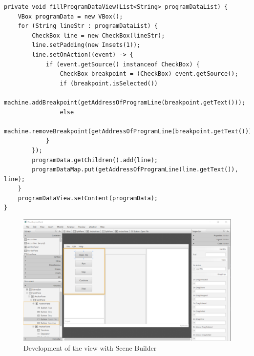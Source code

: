 \begin{lstlisting}[caption={Implementation of program data view},label=listing:ProgramDataView]
private void fillProgramDataView(List<String> programDataList) {
    VBox programData = new VBox();
    for (String lineStr : programDataList) {
        CheckBox line = new CheckBox(lineStr);
        line.setPadding(new Insets(1));
        line.setOnAction((event) -> {
            if (event.getSource() instanceof CheckBox) {
                CheckBox breakpoint = (CheckBox) event.getSource();
                if (breakpoint.isSelected())
                    machine.addBreakpoint(getAddressOfProgramLine(breakpoint.getText()));
                else
                    machine.removeBreakpoint(getAddressOfProgramLine(breakpoint.getText()));
            }
        });
        programData.getChildren().add(line);
        programDataMap.put(getAddressOfProgramLine(line.getText()), line);
    }
    programDataView.setContent(programData);
}
\end{lstlisting}

\begin{figure}[h] 
	\centering
	\includegraphics[scale=.55]{images/view.png}
	\caption{Development of the view with Scene Builder}
	\label{fig:view}
\end{figure}
